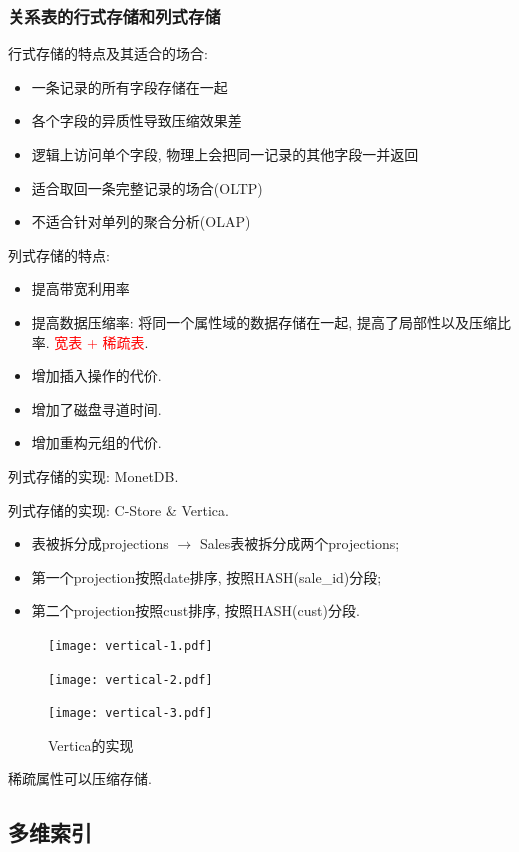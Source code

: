 \subsubsection{关系表的行式存储和列式存储}

行式存储的特点及其适合的场合:
\begin{itemize}
    \item 一条记录的所有字段存储在一起
    \item 各个字段的异质性导致压缩效果差
    \item 逻辑上访问单个字段, 物理上会把同一记录的其他字段一并返回
    \item 适合取回一条完整记录的场合(OLTP)
    \item 不适合针对单列的聚合分析(OLAP)
\end{itemize}

列式存储的特点:
\begin{itemize}
    \item 提高带宽利用率
    \item 提高数据压缩率: 将同一个属性域的数据存储在一起, 提高了局部性以及压缩比率. \textcolor{red}{宽表 + 稀疏表}.
    \item 增加插入操作的代价.
    \item 增加了磁盘寻道时间.
    \item 增加重构元组的代价.
\end{itemize}

列式存储的实现: MonetDB.

列式存储的实现: C-Store\cite{stonebrakerCstoreColumnorientedDBMS2018} \& Vertica\cite{lambVerticaAnalyticDatabase2012}.
\begin{itemize}
    \item 表被拆分成projections $\to$ Sales表被拆分成两个projections;
    \item 第一个projection按照date排序, 按照HASH(sale\_id)分段;
    \item 第二个projection按照cust排序, 按照HASH(cust)分段.
\end{itemize}

\begin{figure}[H]
  \centering
  \begin{minipage}[t]{0.32\textwidth}
    \centering
    \texttt{[image: vertical-1.pdf]}
  \end{minipage}
  \begin{minipage}[t]{0.34\textwidth}
    \centering
    \texttt{[image: vertical-2.pdf]}
  \end{minipage}
  \begin{minipage}[t]{0.3\textwidth}
    \centering
    \texttt{[image: vertical-3.pdf]}
  \end{minipage}
  \caption{Vertica的实现}
  \label{fig:three-side-by-side}
\end{figure}

稀疏属性可以压缩存储.

\subsection{多维索引}



